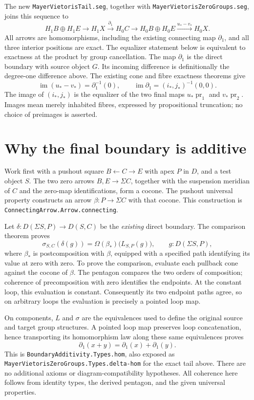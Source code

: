 \documentclass[11pt]{amsart}
\newcommand{\code}[1]{\nolinkurl{#1}}
\begin{document}
The new \code{MayerVietorisTail.seg}, together with
\code{MayerVietorisZeroGroups.seg}, joins this sequence to
\[
 H_1B\oplus H_1E\longrightarrow H_1X
 \xrightarrow{\partial_1}H_0C\longrightarrow H_0B\oplus H_0E
 \xrightarrow{u_*-v_*}H_0X.
\]
All arrows are homomorphisms, including the existing connecting map
$\partial_1$, and all three interior positions are exact.
The equalizer statement below is equivalent to exactness at the product
by group cancellation.
The map $\partial_1$ is the direct boundary with source object
$G$. Its incoming difference is definitionally the degree-one
difference above. The existing cone and fibre exactness theorems give
\[
 \operatorname{im}(u_*-v_*)=\partial_1^{-1}(0),\qquad
 \operatorname{im}\partial_1=(i_*,j_*)^{-1}(0,0).
\]
The image of $(i_*,j_*)$ is the equalizer of the two final maps
$u_*\operatorname{pr}_1$ and $v_*\operatorname{pr}_2$.
Images mean merely inhabited fibres, expressed by propositional
truncation; no choice of preimages is asserted.

\section{Why the final boundary is additive}
Work first with a pushout square $B\leftarrow C\to E$ with apex $P$
in $D$, and a test object $S$. The two zero arrows
$B,E\to\Sigma C$, together with the suspension meridian of $C$
and the zero-map identifications, form a cocone. The pushout universal
property constructs an arrow $\beta:P\to\Sigma C$ with that cocone.
This construction is \code{ConnectingArrow.Arrow.connecting}.

Let $\delta:D(\Sigma S,P)\to D(S,C)$ be the \emph{existing} direct
boundary. The comparison theorem proves
\[
 \sigma_{S,C}(\delta(g))
   =\Omega(\beta_*)\bigl(L_{S,P}(g)\bigr),
 \qquad g:D(\Sigma S,P),
\]
where $\beta_*$ is postcomposition with $\beta$, equipped with a
specified path identifying its value at zero with zero.
To prove the comparison, evaluate each pullback cone against the cocone
of $\beta$. The pentagon compares the two orders of composition;
coherence of precomposition with zero identifies the endpoints.
At the constant loop, this evaluation is constant. Consequently its
two endpoint paths agree, so on arbitrary loops the evaluation is
precisely a pointed loop map.

On components, $L$ and $\sigma$ are the equivalences used to define
the original source and target group structures. A pointed loop map
preserves loop concatenation, hence transporting its homomorphism law
along these same equivalences proves
\[
 \partial_1(x+y)=\partial_1(x)+\partial_1(y).
\]
This is \code{BoundaryAdditivity.Types.hom}, also exposed as
\code{MayerVietorisZeroGroups.Types.delta-hom} for the exact tail above.
There are no additional axioms or diagram-compatibility hypotheses.
All coherence here follows from identity types, the derived pentagon,
and the given universal properties.
\end{document}
